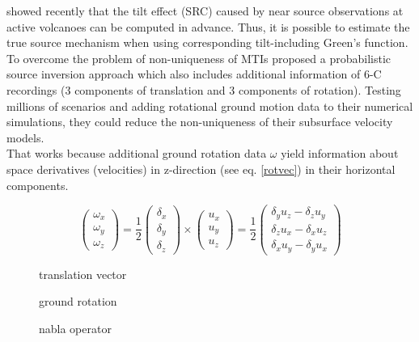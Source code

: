\documentclass[12pt, a4paper]{article}
\begin{document}
\citet{Maeda2011, vanDriel2012} showed recently that the tilt effect (SRC) caused by near source observations at active volcanoes can be computed in advance. Thus, it is possible to estimate the true source mechanism when using corresponding tilt-including Green's function.\\
To overcome the problem of non-uniqueness of MTIs \citet{Bernauer2014} proposed a probabilistic source inversion approach which also includes additional information of 6-C recordings (3 components of translation and 3 components of rotation). Testing millions of scenarios and adding rotational ground motion data to their numerical simulations, they could reduce the non-uniqueness of their subsurface velocity models.\\
That works because additional ground rotation data $\omega$ yield information about space derivatives (velocities) in z-direction (see eq. \ref{rotvec}) in their horizontal components.
\begin{figure}[!htp]
\begin{equation}
	\left(\begin{array}{c}
		\omega_x \\ \omega_y \\ \omega_z
    \end{array}\right) = \frac{1}{2}
	\left(\begin{array}{c}
		\delta_x \\ \delta_y \\ \delta_z
    \end{array}\right) \times
	\left(\begin{array}{c}
		u_x \\ u_y \\ u_z
    \end{array}\right) = \frac{1}{2}
	\left(\begin{array}{c}
		\delta_y u_z - \delta_z u_y \\ \delta_z u_x - \delta_x u_z \\ \delta_x u_y - \delta_y u_x
    \end{array}\right)
    \label{rotvec}
\end{equation}
\begin{description}
\centering
	\item[u = ($u_x$,$u_y$,$u_z$)] translation vector
	\item[$\omega$ = ($\omega_x$,$\omega_y$,$\omega_z$)] ground rotation 
	\item[$\bigtriangledown$ = ($\delta_x$,$\delta_y$,$\delta_z$)] nabla operator     
\end{description}
\end{figure}
\end{document}
